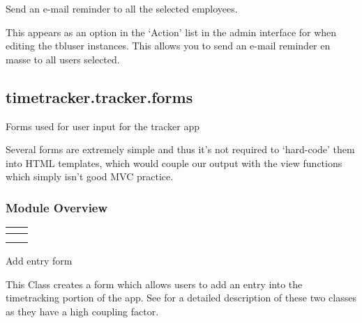\documentclass[letterpaper,10pt,english]{sphinxmanual}
\begin{document}

\begin{fulllineitems}
\label{timetracker:timetracker.tracker.admin.send_password_reminder}
Send an e-mail reminder to all the selected employees.

This appears as an option in the `Action' list in the admin interface for
when editing the tbluser instances. This allows you to send an e-mail
reminder en masse to all users selected.

\end{fulllineitems}



\subsection{timetracker.tracker.forms}
\label{timetracker:timetracker-tracker-forms}\label{timetracker:module-timetracker.tracker.forms}
Forms used for user input for the tracker app

Several forms are extremely simple and thus it's not required to `hard-code'
them into HTML templates, which would couple our output with the view
functions which simply isn't good MVC practice.


\subsubsection{Module Overview}
\label{timetracker:module-overview}
\begin{tabulary}{\linewidth}{|L|L|}
\hline
\textbf{} & \textbf{}\\\hline

{\hyperref[timetracker:timetracker.tracker.forms.EntryForm]{}}
 & 
{\hyperref[timetracker:timetracker.tracker.forms.AddForm]{}}
\\\hline

{\hyperref[timetracker:timetracker.tracker.forms.Login]{}}
 & \\\hline
\end{tabulary}


\begin{fulllineitems}
\label{timetracker:timetracker.tracker.forms.AddForm}
Add entry form

This Class creates a form which allows users to add an entry into the
timetracking portion of the app. See  for a detailed
description of these two classes as they have a high coupling factor.

\end{fulllineitems}
\end{document}
